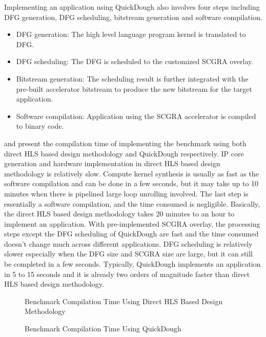Implementing an application using QuickDough also involves four steps including DFG generation, DFG scheduling, bitstream generation and software compilation.
\begin{itemize}
\renewcommand\labelitemi{$\bullet$}
\setlength\itemindent{1em}
\item DFG generation: The high level language program kernel is translated to DFG.
\item DFG scheduling: The DFG is scheduled to the customized SCGRA overlay. 
\item Bitstream generation: The scheduling result is further integrated with the pre-built accelerator bitstream to produce the new bitstream for the target application. 
\item Software compilation: Application using the SCGRA accelerator is compiled to binary code.
\end{itemize}

 and  present the compilation time of implementing the benchmark using both direct HLS based design methodology and QuickDough respectively. IP core generation and hardware implementation in direct HLS based design methodology is relatively slow. Compute kernel synthesis is usually as fast as the software compilation and can be done in a few seconds, but it may take up to 10 minutes when there is pipelined large loop unrolling involved. The last step is essentially a software compilation, and the time consumed is negligible. Basically, the direct HLS based design methodology takes 20 minutes to an hour to implement an application. With pre-implemented SCGRA overlay, the processing steps except the DFG scheduling of QuickDough are fast and the time consumed doesn't change much across different applications. DFG scheduling is relatively slower especially when the DFG size and SCGRA size are large, but it can still be completed in a few seconds. Typically, QuickDough implements an application in 5 to 15 seconds and it is already two orders of magnitude faster than direct HLS based design methodology. 

\begin{figure}[htb]
\caption{Benchmark Compilation Time Using Direct HLS Based Design Methodology}
\label{fig:Vivado-HLS-Compilation-Time}
\end{figure}

\begin{figure}[htpb]
\caption{Benchmark Compilation Time Using QuickDough}
\label{fig:SCGRA-Overlay-Compilation-Time}
\end{figure}

